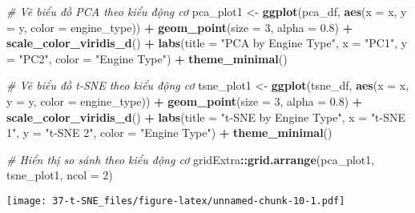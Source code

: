 \documentclass[
]{article}
\newenvironment{Shaded}{\begin{snugshade}}{\end{snugshade}}
\newcommand{\AttributeTok}[1]{\textcolor[rgb]{0.13,0.29,0.53}{#1}}
\newcommand{\CommentTok}[1]{\textcolor[rgb]{0.56,0.35,0.01}{\textit{#1}}}
\newcommand{\DecValTok}[1]{\textcolor[rgb]{0.00,0.00,0.81}{#1}}
\newcommand{\FloatTok}[1]{\textcolor[rgb]{0.00,0.00,0.81}{#1}}
\newcommand{\FunctionTok}[1]{\textcolor[rgb]{0.13,0.29,0.53}{\textbf{#1}}}
\newcommand{\NormalTok}[1]{#1}
\newcommand{\OtherTok}[1]{\textcolor[rgb]{0.56,0.35,0.01}{#1}}
\newcommand{\SpecialCharTok}[1]{\textcolor[rgb]{0.81,0.36,0.00}{\textbf{#1}}}
\newcommand{\StringTok}[1]{\textcolor[rgb]{0.31,0.60,0.02}{#1}}
\begin{document}
\begin{Shaded}
\begin{Highlighting}[]
\CommentTok{\# Vẽ biểu đồ PCA theo kiểu động cơ}
\NormalTok{pca\_plot1 }\OtherTok{\textless{}{-}} \FunctionTok{ggplot}\NormalTok{(pca\_df, }\FunctionTok{aes}\NormalTok{(}\AttributeTok{x =}\NormalTok{ x, }\AttributeTok{y =}\NormalTok{ y, }\AttributeTok{color =}\NormalTok{ engine\_type)) }\SpecialCharTok{+}
  \FunctionTok{geom\_point}\NormalTok{(}\AttributeTok{size =} \DecValTok{3}\NormalTok{, }\AttributeTok{alpha =} \FloatTok{0.8}\NormalTok{) }\SpecialCharTok{+}
  \FunctionTok{scale\_color\_viridis\_d}\NormalTok{() }\SpecialCharTok{+}
  \FunctionTok{labs}\NormalTok{(}\AttributeTok{title =} \StringTok{"PCA by Engine Type"}\NormalTok{,}
       \AttributeTok{x =} \StringTok{"PC1"}\NormalTok{,}
       \AttributeTok{y =} \StringTok{"PC2"}\NormalTok{,}
       \AttributeTok{color =} \StringTok{"Engine Type"}\NormalTok{) }\SpecialCharTok{+}
  \FunctionTok{theme\_minimal}\NormalTok{()}

\CommentTok{\# Vẽ biểu đồ t{-}SNE theo kiểu động cơ}
\NormalTok{tsne\_plot1 }\OtherTok{\textless{}{-}} \FunctionTok{ggplot}\NormalTok{(tsne\_df, }\FunctionTok{aes}\NormalTok{(}\AttributeTok{x =}\NormalTok{ x, }\AttributeTok{y =}\NormalTok{ y, }\AttributeTok{color =}\NormalTok{ engine\_type)) }\SpecialCharTok{+}
  \FunctionTok{geom\_point}\NormalTok{(}\AttributeTok{size =} \DecValTok{3}\NormalTok{, }\AttributeTok{alpha =} \FloatTok{0.8}\NormalTok{) }\SpecialCharTok{+}
  \FunctionTok{scale\_color\_viridis\_d}\NormalTok{() }\SpecialCharTok{+}
  \FunctionTok{labs}\NormalTok{(}\AttributeTok{title =} \StringTok{"t{-}SNE by Engine Type"}\NormalTok{,}
       \AttributeTok{x =} \StringTok{"t{-}SNE 1"}\NormalTok{,}
       \AttributeTok{y =} \StringTok{"t{-}SNE 2"}\NormalTok{,}
       \AttributeTok{color =} \StringTok{"Engine Type"}\NormalTok{) }\SpecialCharTok{+}
  \FunctionTok{theme\_minimal}\NormalTok{()}

\CommentTok{\# Hiển thị so sánh theo kiểu động cơ}
\NormalTok{gridExtra}\SpecialCharTok{::}\FunctionTok{grid.arrange}\NormalTok{(pca\_plot1, tsne\_plot1, }\AttributeTok{ncol =} \DecValTok{2}\NormalTok{)}
\end{Highlighting}
\end{Shaded}

\texttt{[image: 37-t-SNE\_files/figure-latex/unnamed-chunk-10-1.pdf]}
\end{document}
